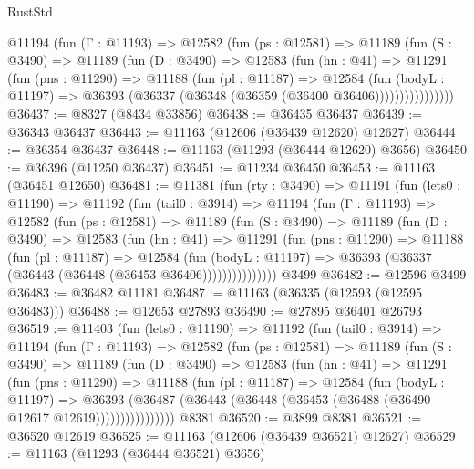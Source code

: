 \begin{lexlean}{RustStd}
\begin{coremodule}
          @11194
            (fun (Γ : @11193) =>
            @12582
              (fun (ps : @12581) =>
              @11189
                (fun (S : @3490) =>
                @11189
                  (fun (D : @3490) =>
                  @12583
                    (fun (hn : @41) =>
                    @11291
                      (fun (pns : @11290) =>
                      @11188
                        (fun (pl : @11187) =>
                        @12584
                          (fun (bodyL : @11197) =>
                          @36393 (@36337 (@36348 (@36359 (@36400 @36406))))))))))))))))
@36437 := @8327 (@8434 @33856)
@36438 := @36435 @36437
@36439 := @36343 @36437
@36443 := @11163 (@12606 (@36439 @12620) @12627)
@36444 := @36354 @36437
@36448 := @11163 (@11293 (@36444 @12620) @3656)
@36450 := @36396 (@11250 @36437)
@36451 := @11234 @36450
@36453 := @11163 (@36451 @12650)
@36481 := @11381
    (fun (rty : @3490) =>
    @11191
      (fun (lets0 : @11190) =>
      @11192
        (fun (tail0 : @3914) =>
        @11194
          (fun (Γ : @11193) =>
          @12582
            (fun (ps : @12581) =>
            @11189
              (fun (S : @3490) =>
              @11189
                (fun (D : @3490) =>
                @12583
                  (fun (hn : @41) =>
                  @11291
                    (fun (pns : @11290) =>
                    @11188
                      (fun (pl : @11187) =>
                      @12584
                        (fun (bodyL : @11197) =>
                        @36393 (@36337 (@36443 (@36448 (@36453 @36406)))))))))))))))
    @3499
@36482 := @12596 @3499
@36483 := @36482 @11181
@36487 := @11163 (@36335 (@12593 (@12595 @36483)))
@36488 := @12653 @27893
@36490 := @27895 @36401 @26793
@36519 := @11403
    (fun (lets0 : @11190) =>
    @11192
      (fun (tail0 : @3914) =>
      @11194
        (fun (Γ : @11193) =>
        @12582
          (fun (ps : @12581) =>
          @11189
            (fun (S : @3490) =>
            @11189
              (fun (D : @3490) =>
              @12583
                (fun (hn : @41) =>
                @11291
                  (fun (pns : @11290) =>
                  @11188
                    (fun (pl : @11187) =>
                    @12584
                      (fun (bodyL : @11197) =>
                      @36393
                        (@36487
                          (@36443 (@36448 (@36453 (@36488 (@36490 @12617 @12619))))))))))))))))
    @8381
@36520 := @3899 @8381
@36521 := @36520 @12619
@36525 := @11163 (@12606 (@36439 @36521) @12627)
@36529 := @11163 (@11293 (@36444 @36521) @3656)

\end{coremodule}
\end{lexlean}
